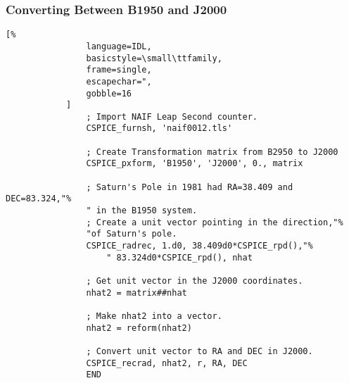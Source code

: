 \documentclass[crop=false,class=book]{standalone}
\begin{document}
        \subsubsection{Converting Between B1950 and J2000}
            \begin{lstlisting}[%
                language=IDL,
                basicstyle=\small\ttfamily,
                frame=single,
                escapechar=",
                gobble=16
            ]
                ; Import NAIF Leap Second counter.
                CSPICE_furnsh, 'naif0012.tls'

                ; Create Transformation matrix from B2950 to J2000
                CSPICE_pxform, 'B1950', 'J2000', 0., matrix

                ; Saturn's Pole in 1981 had RA=38.409 and DEC=83.324,"%
                " in the B1950 system.
                ; Create a unit vector pointing in the direction,"%
                "of Saturn's pole.
                CSPICE_radrec, 1.d0, 38.409d0*CSPICE_rpd(),"%
                    " 83.324d0*CSPICE_rpd(), nhat

                ; Get unit vector in the J2000 coordinates.
                nhat2 = matrix##nhat

                ; Make nhat2 into a vector.
                nhat2 = reform(nhat2)

                ; Convert unit vector to RA and DEC in J2000.
                CSPICE_recrad, nhat2, r, RA, DEC
                END
            \end{lstlisting}
\end{document}
